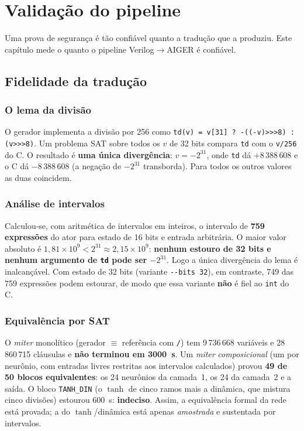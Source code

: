 \documentclass[12pt,openright,oneside,a4paper,chapter=TITLE,sumario=tradicional,english,brazil]{abntex2}
\begin{document}
\chapter{Validação do pipeline}\label{cap:valid}

Uma prova de segurança é tão confiável quanto a tradução que a produziu. Este capítulo mede o quanto o pipeline Verilog$\to$AIGER é confiável.

\section{Fidelidade da tradução}

\subsection{O lema da divisão}

O gerador implementa a divisão por 256 como \texttt{td(v) = v[31] ? -((-v)>{}>{}>8) : (v>{}>{}>8)}. Um problema SAT sobre todos os $v$ de 32 bits compara \texttt{td} com o \texttt{v/256} do C. O resultado é \textbf{uma única divergência}: $v=-2^{31}$, onde \texttt{td} dá $+8\,388\,608$ e o C dá $-8\,388\,608$ (a negação de $-2^{31}$ transborda). Para todos os outros valores as duas coincidem.

\subsection{Análise de intervalos}

Calculou-se, com aritmética de intervalos em inteiros, o intervalo de \textbf{759 expressões} do ator para estado de 16 bits e entrada arbitrária. O maior valor absoluto é $1{,}81\times10^9<2^{31}\approx2{,}15\times10^9$: \textbf{nenhum estouro de 32 bits e nenhum argumento de \texttt{td} pode ser $-2^{31}$}. Logo a única divergência do lema é inalcançável. Com estado de 32 bits (variante \texttt{-{}-bits 32}), em contraste, 749 das 759 expressões podem estourar, de modo que essa variante \textbf{não} é fiel ao \texttt{int} do C.

\subsection{Equivalência por SAT}

O \emph{miter} monolítico (gerador $\equiv$ referência com \texttt{/}) tem 9\,736\,668 variáveis e 28\,860\,715 cláusulas e \textbf{não terminou em 3000~s}. Um \emph{miter} \emph{composicional} (um por neurônio, com entradas livres restritas aos intervalos calculados) provou \textbf{49 de 50 blocos equivalentes}: os 24 neurônios da camada~1, os 24 da camada~2 e a saída. O bloco \texttt{TANH\_DIN} (o $\tanh$ de cinco ramos mais a dinâmica, que mistura cinco divisões) estourou 600~s: \textbf{indeciso}. Assim, a equivalência formal da rede está provada; a do $\tanh$/dinâmica está apenas \emph{amostrada} e sustentada por intervalos.
\end{document}
